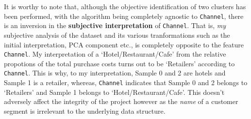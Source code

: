 \documentclass{article}
\begin{document}
It is worthy to note that, although the objective identification of two
clusters has been performed, with the algorithm being completely
agnostic to \texttt{\textquotesingle{}Channel\textquotesingle{}}, there
is an inversion in the \textbf{subjective interpretation} of
\texttt{\textquotesingle{}Channel\textquotesingle{}}. That is, \emph{my}
subjective analysis of the dataset and its various tranformations such
as the initial interpretation, PCA component etc., is completely
opposite to the feature
\texttt{\textquotesingle{}Channel\textquotesingle{}}. My interpretation
of a `Hotel/Restaurant/Cafe' from the relative propotions of the total
purchase costs turns out to be `Retailers' according to
\texttt{\textquotesingle{}Channel\textquotesingle{}}. This is why, to my
interpretation, Sample 0 and 2 are hotels and Sample 1 is a retailer,
whereas, \texttt{\textquotesingle{}Channel\textquotesingle{}} indicates
that Sample 0 and 2 belongs to `Retailers' and Sample 1 belongs to
`Hotel/Restaurant/Cafe'. This doesn't adversely affect the integrity of
the project however as the \emph{name} of a customer segment is
irrelevant to the underlying data structure.


    
    
    
    
\end{document}
